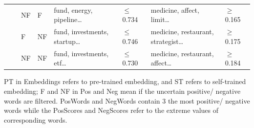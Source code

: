 \documentclass[a4paper, 12pt]{report}
\begin{document}
\begin{table}
{\begin{tabular}{|l|l|l|l|l|l|l|l|}
    &  & NF & F & fund, energy, pipeline… & $\leqslant$ 0.734 & medicine, affect, limit… & $\geqslant$ 0.165 \\
    &  & F & NF & fund, investments, startup… & $\leqslant$ 0.746 & medicine, restaurant, strategist… & $\geqslant$ 0.175 \\
    &  & NF & NF & fund, investments, etf… & $\leqslant$ 0.730 & medicine, restaurant, affect… & $\geqslant$ 0.184 \\
    \hline
    \end{tabular}
    }
    \begin{tablenotes}
    \footnotesize
    \item PT in Embeddings refers to pre-trained embedding, and ST refers to self-trained embedding; F and NF in Pos and Neg mean if the uncertain positive/ negative words are filtered. PosWords and NegWords contain 3 the most positive/ negative words while the PosScores and NegScores refer to the extreme values of corresponding words.
    \end{tablenotes}
    \label{Tab: WSJ senti words}
    \end{table}

\newpage
\end{document}
